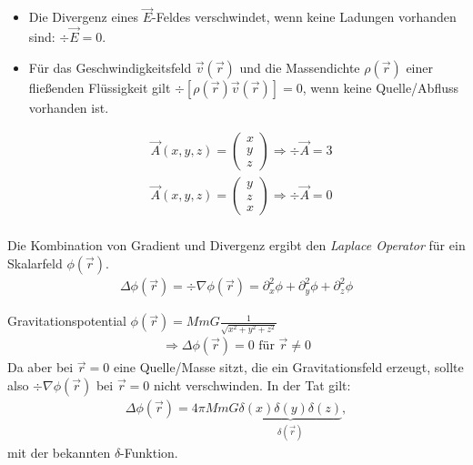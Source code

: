 \begin{itemize}
  \item Die Divergenz eines $\vec{E}$-Feldes verschwindet, wenn keine Ladungen
  vorhanden sind: $\div \vec{E} = 0$.
  \item Für das Geschwindigkeitsfeld $\vec{v}(\vec{r})$ und die Massendichte
  $\rho(\vec{r})$ einer fließenden Flüssigkeit gilt $\div \left[
  \rho(\vec{r})\vec{v}(\vec{r}) \right] = 0$, wenn keine Quelle/Abfluss
  vorhanden ist.
\end{itemize}

\begin{Beispiel}
\begin{align*}
&\vec{A}(x,y,z) = \begin{pmatrix}x\\y\\z\end{pmatrix} \Rightarrow \div \vec{A}
= 3\\
&\vec{A}(x,y,z) = \begin{pmatrix}y\\z\\x\end{pmatrix} \Rightarrow \div \vec{A}
= 0\\
\end{align*}
\end{Beispiel}

\begin{Definition}
Die Kombination von Gradient und Divergenz ergibt den {\em Laplace Operator}
für ein Skalarfeld $\phi(\vec{r})$.
\begin{align*}
\Delta \phi(\vec{r}) = \div \nabla \phi(\vec{r}) = \partial^2_x\phi +
\partial^2_y\phi + \partial^2_z\phi
\end{align*}
\end{Definition}

\begin{Beispiel}
Gravitationspotential $\phi(\vec{r}) = MmG \frac{1}{\sqrt{x^2+y^2+z^2}}$
\begin{align*}
\Rightarrow \Delta \phi(\vec{r}) = 0 \text{ für } \vec{r} \neq 0
\end{align*}
Da aber bei $\vec{r} = 0$ eine Quelle/Masse sitzt, die ein Gravitationsfeld
erzeugt, sollte also $\div \nabla \phi(\vec{r})$ bei $\vec{r} = 0$ nicht
verschwinden. In der Tat gilt:
\begin{align*}
\Delta \phi(\vec{r}) = 4\pi MmG
\underbrace{\delta(x)\delta(y)\delta(z)}_{\delta(\vec{r})},
\end{align*}
mit der bekannten $\delta$-Funktion.
\end{Beispiel}

